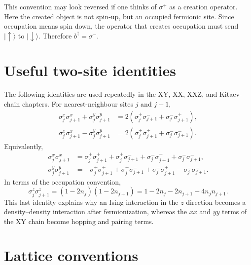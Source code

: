 \begin{remark}[Why $b=\sigma^+$ but $b^\dagger=\sigma^-$]
This convention may look reversed if one thinks of $\sigma^+$ as a creation
operator. Here the created object is not spin-up, but an occupied fermionic site.
Since occupation means spin down, the operator that creates occupation must send
$|\uparrow\rangle$ to $|\downarrow\rangle$. Therefore $b^\dagger=\sigma^-$.
\end{remark}

\section{Useful two-site identities}

The following identities are used repeatedly in the XY, XX, XXZ, and Kitaev-chain
chapters. For nearest-neighbour sites $j$ and $j+1$,
\begin{align}
\label{eq:xy-raising-lowering-identity}
    \sigma_j^x\sigma_{j+1}^x+
    \sigma_j^y\sigma_{j+1}^y
    &=
    2\left(
        \sigma_j^+\sigma_{j+1}^-
        +
        \sigma_j^-\sigma_{j+1}^+
    \right),
    \\
\label{eq:pairing-raising-lowering-identity}
    \sigma_j^x\sigma_{j+1}^x-
    \sigma_j^y\sigma_{j+1}^y
    &=
    2\left(
        \sigma_j^+\sigma_{j+1}^+
        +
        \sigma_j^-\sigma_{j+1}^-
    \right).
\end{align}
Equivalently,
\begin{align}
    \sigma_j^x\sigma_{j+1}^x
    &=
    \sigma_j^+\sigma_{j+1}^+
    +
    \sigma_j^+\sigma_{j+1}^-
    +
    \sigma_j^-\sigma_{j+1}^+
    +
    \sigma_j^-\sigma_{j+1}^-,
    \\
    \sigma_j^y\sigma_{j+1}^y
    &=
    -\sigma_j^+\sigma_{j+1}^+
    +
    \sigma_j^+\sigma_{j+1}^-
    +
    \sigma_j^-\sigma_{j+1}^+
    -
    \sigma_j^-\sigma_{j+1}^- .
\end{align}
In terms of the occupation convention,
\begin{equation}
\label{eq:zz-number-identity}
    \sigma_j^z\sigma_{j+1}^z
    =
    (1-2n_j)(1-2n_{j+1})
    =
    1-2n_j-2n_{j+1}+4n_jn_{j+1}.
\end{equation}
This last identity explains why an Ising interaction in the $z$ direction becomes a
density--density interaction after fermionization, whereas the $xx$ and $yy$ terms
of the XY chain become hopping and pairing terms.

\section{Lattice conventions}

